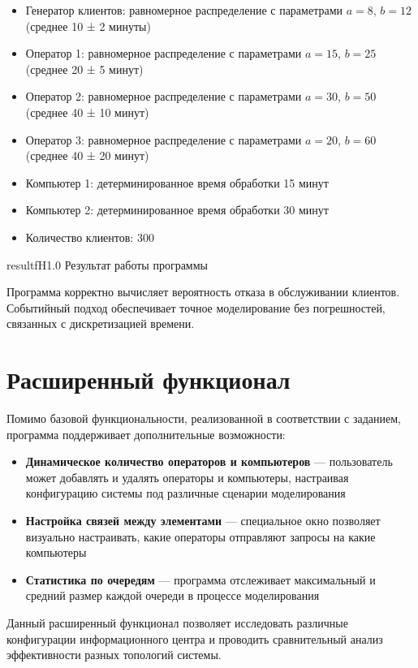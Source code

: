\begin{itemize}
    \item Генератор клиентов: равномерное распределение с параметрами $a = 8$, $b = 12$ (среднее 10 ± 2 минуты)
    \item Оператор 1: равномерное распределение с параметрами $a = 15$, $b = 25$ (среднее 20 ± 5 минут)
    \item Оператор 2: равномерное распределение с параметрами $a = 30$, $b = 50$ (среднее 40 ± 10 минут)
    \item Оператор 3: равномерное распределение с параметрами $a = 20$, $b = 60$ (среднее 40 ± 20 минут)
    \item Компьютер 1: детерминированное время обработки 15 минут
    \item Компьютер 2: детерминированное время обработки 30 минут
    \item Количество клиентов: 300
\end{itemize}

	{result}{f}{H}{1.0\textwidth}
	{Результат работы программы}

Программа корректно вычисляет вероятность отказа в обслуживании клиентов. Событийный подход обеспечивает точное моделирование без погрешностей, связанных с дискретизацией времени.

\section{Расширенный функционал}

Помимо базовой функциональности, реализованной в соответствии с заданием, программа поддерживает дополнительные возможности:

\begin{itemize}
    \item \textbf{Динамическое количество операторов и компьютеров} — пользователь может добавлять и удалять операторы и компьютеры, настраивая конфигурацию системы под различные сценарии моделирования
    \item \textbf{Настройка связей между элементами} — специальное окно позволяет визуально настраивать, какие операторы отправляют запросы на какие компьютеры
    \item \textbf{Статистика по очередям} — программа отслеживает максимальный и средний размер каждой очереди в процессе моделирования
\end{itemize}

Данный расширенный функционал позволяет исследовать различные конфигурации информационного центра и проводить сравнительный анализ эффективности разных топологий системы.

